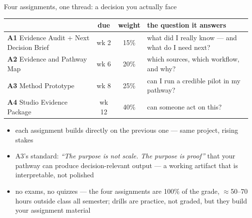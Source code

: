 \documentclass[aspectratio=169,10pt]{beamer}
\newcommand{\muted}[1]{{\color{cMute}#1}}
\begin{document}
\begin{frame}{Four assignments, one thread: a decision you actually face}
  \small
  \begin{tabular}{@{}p{}ccp{}@{}}
    & \muted{due} & \muted{weight} & \muted{the question it answers}\\
    \midrule
    \textbf{A1} Evidence Audit + Next Decision Brief & wk 2 & 15\% &
      what did I really know --- and what do I need next?\\[.5mm]
    \textbf{A2} Evidence and Pathway Map & wk 6 & 20\% &
      which sources, which workflow, and why?\\[.5mm]
    \textbf{A3} Method Prototype & wk 8 & 25\% &
      can I run a credible pilot in my pathway?\\[.5mm]
    \textbf{A4} Studio Evidence Package & wk 12 & 40\% &
      can someone act on this?\\
  \end{tabular}
  \vspace{2mm}

  \begin{itemize}
    \item each assignment builds directly on the previous one --- same project,
          rising stakes
    \item A3's standard: \emph{``The purpose is not scale. The purpose is
          proof''} that your pathway can produce decision-relevant output ---
          a working artifact that is \alert{interpretable, not polished}
    \item no exams, no quizzes --- the four assignments are 100\% of the
          grade, \(\approx\)50--70 hours outside class all semester; drills
          are practice, not graded, but they build your assignment material
  \end{itemize}
\end{frame}
\end{document}
